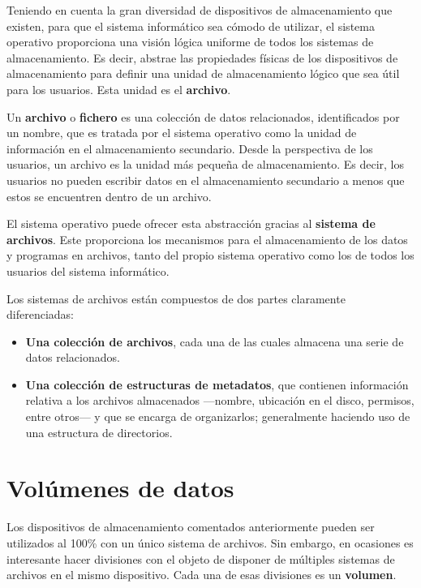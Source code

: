Teniendo en cuenta la gran diversidad de dispositivos de almacenamiento
que existen, para que el sistema informático sea cómodo de utilizar, el
sistema operativo proporciona una visión lógica uniforme de todos los
sistemas de almacenamiento. Es decir, abstrae las propiedades físicas de
los dispositivos de almacenamiento para definir una unidad de
almacenamiento lógico que sea útil para los usuarios. Esta unidad es el
\textbf{archivo}.

Un \textbf{{}archivo} o \textbf{{}fichero} es una colección de datos
relacionados, identificados por un nombre, que es tratada por el sistema
operativo como la unidad de información en el almacenamiento secundario.
Desde la perspectiva de los usuarios, un archivo es la unidad más
pequeña de almacenamiento. Es decir, los usuarios no pueden escribir
datos en el almacenamiento secundario a menos que estos se encuentren
dentro de un archivo.

El sistema operativo puede ofrecer esta abstracción gracias al
\textbf{sistema de archivos}{}. Este proporciona los mecanismos para el
almacenamiento de los datos y programas en archivos, tanto del propio
sistema operativo como los de todos los usuarios del sistema
informático.

Los sistemas de archivos están compuestos de dos partes claramente
diferenciadas:

\begin{itemize}
\item
  \textbf{Una colección de archivos}, cada una de las cuales almacena
  una serie de datos relacionados.
\item
  \textbf{Una colección de estructuras de metadatos}, que contienen
  información relativa a los archivos almacenados ---nombre, ubicación
  en el disco, permisos, entre otros--- y que se encarga de
  organizarlos; generalmente haciendo uso de una estructura de
  directorios.
\end{itemize}

\section{Volúmenes de datos}\label{_voluxfamenes_de_datos}

Los dispositivos de almacenamiento comentados anteriormente pueden ser
utilizados al 100\% con un único sistema de archivos. Sin embargo, en
ocasiones es interesante hacer divisiones con el objeto de disponer de
múltiples sistemas de archivos en el mismo dispositivo. Cada una de esas
divisiones es un \textbf{volumen}.

